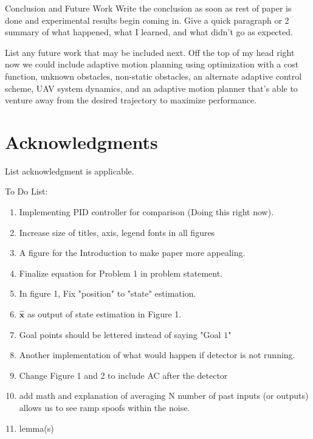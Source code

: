 
\begin{section}{Conclusion and Future Work} \label{sec:conclusion}
Write the conclusion as soon as rest of paper is done and experimental results begin coming in. Give a quick paragraph or 2 summary of what happened, what I learned, and what didn't go as expected.

List any future work that may be included next. Off the top of my head right now we could include adaptive motion planning using optimization with a cost function, unknown obstacles, non-static obstacles, an alternate adaptive control scheme, UAV system dynamics, and an adaptive motion planner that's able to venture away from the desired trajectory to maximize performance.

\end{section}

\section*{Acknowledgments} 
List acknowledgment is applicable.


To Do List:

	\begin{enumerate}[leftmargin=1\parindent]
	\item Implementing PID controller for comparison (Doing this right now).
	\item Increase size of titles, axis, legend fonts in all figures
	\item A figure for the Introduction to make paper more appealing.
	\item Finalize equation for Problem 1 in problem statement.
	\item In figure 1, Fix "position" to "state" estimation.
	\item $\hat{\bm{x}}$ as output of state estimation in Figure 1.
	\item Goal points should be lettered instead of saying "Goal $1$"
	\item Another implementation of what would happen if detector is not running.
	\item Change Figure 1 and 2 to include AC after the detector
	\item add math and explanation of averaging N number of past inputs (or outputs) allows us to see ramp spoofs within the noise.
	\item lemma(s)
	
	\end{enumerate}
	

